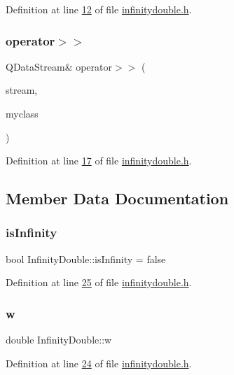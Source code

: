 Definition at line \hyperlink{a00059_source_l00012}{12} of file \hyperlink{a00059_source}{infinitydouble.\+h}.

\mbox{\label{a00161_a6ccd429a9269b6aeb8d45f3579caf3b0}} 
\subsubsection{\texorpdfstring{operator$>$$>$}{operator>>}}
{\footnotesize\ttfamily Q\+Data\+Stream\& operator$>$$>$ (\begin{DoxyParamCaption}\item[{Q\+Data\+Stream \&}]{stream,  }\item[{\hyperlink{a00161}{Infinity\+Double} \&}]{myclass }\end{DoxyParamCaption})\hspace{0.3cm}{\ttfamily [friend]}}



Definition at line \hyperlink{a00059_source_l00017}{17} of file \hyperlink{a00059_source}{infinitydouble.\+h}.



\subsection{Member Data Documentation}
\mbox{\label{a00161_a435ef98a3b05725db8c963f7f41e32ef}} 
\subsubsection{\texorpdfstring{is\+Infinity}{isInfinity}}
{\footnotesize\ttfamily bool Infinity\+Double\+::is\+Infinity = false\hspace{0.3cm}{\ttfamily [private]}}



Definition at line \hyperlink{a00059_source_l00025}{25} of file \hyperlink{a00059_source}{infinitydouble.\+h}.

\mbox{\label{a00161_a41b95322310121af834ac42159fff654}} 
\subsubsection{\texorpdfstring{w}{w}}
{\footnotesize\ttfamily double Infinity\+Double\+::w\hspace{0.3cm}{\ttfamily [private]}}



Definition at line \hyperlink{a00059_source_l00024}{24} of file \hyperlink{a00059_source}{infinitydouble.\+h}.

